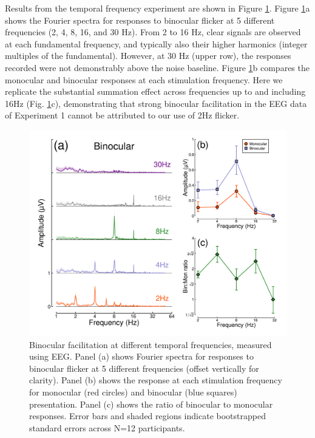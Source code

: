 \documentclass[
]{article}
\begin{document}
Results from the temporal frequency experiment are shown in Figure \ref{fig:TFdata}. Figure \ref{fig:TFdata}a shows the Fourier spectra for responses to binocular flicker at 5 different frequencies (2, 4, 8, 16, and 30 Hz). From 2 to 16 Hz, clear signals are observed at each fundamental frequency, and typically also their higher harmonics (integer multiples of the fundamental). However, at 30 Hz (upper row), the responses recorded were not demonstrably above the noise baseline. Figure \ref{fig:TFdata}b compares the monocular and binocular responses at each stimulation frequency. Here we replicate the substantial summation effect across frequencies up to and including 16Hz (Fig. \ref{fig:TFdata}c), demonstrating that strong binocular facilitation in the EEG data of Experiment 1 cannot be attributed to our use of 2Hz flicker.

\begin{figure}

{\centering \includegraphics{Figures/TFdata} 

}

\caption{Binocular facilitation at different temporal frequencies, measured using EEG. Panel (a) shows Fourier spectra for responses to binocular flicker at 5 different frequencies (offset vertically for clarity). Panel (b) shows the response at each stimulation frequency for monocular (red circles) and binocular (blue squares) presentation. Panel (c) shows the ratio of binocular to monocular responses. Error bars and shaded regions indicate bootstrapped standard errors across N=12 participants.}\label{fig:TFdata}
\end{figure}
\end{document}
